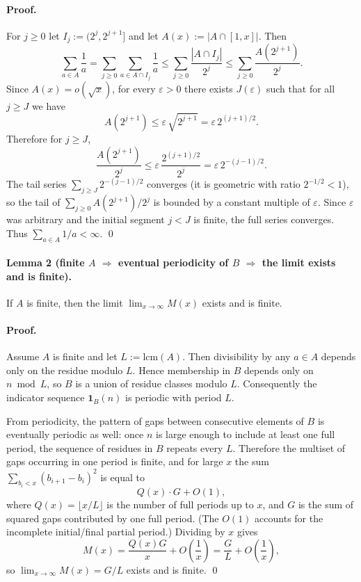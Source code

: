 \paragraph{Proof.}
For $j\ge 0$ let $I_j:=(2^j,2^{j+1}]$ and let $A(x):=|A\cap[1,x]|$.
Then
\[
\sum_{a\in A}\frac{1}{a}
= \sum_{j\ge 0}\sum_{a\in A\cap I_j}\frac{1}{a}
\le \sum_{j\ge 0}\frac{|A\cap I_j|}{2^j}
\le \sum_{j\ge 0}\frac{A(2^{j+1})}{2^j}.
\]
Since $A(x)=o(\sqrt x)$, for every $\varepsilon>0$ there exists $J(\varepsilon)$ such that for all $j\ge J$ we have
\[A(2^{j+1}) \le \varepsilon\,\sqrt{2^{j+1}}=\varepsilon\,2^{(j+1)/2}.
\]
Therefore for $j\ge J$,
\[\frac{A(2^{j+1})}{2^j} \le \varepsilon\,\frac{2^{(j+1)/2}}{2^j}=\varepsilon\,2^{-(j-1)/2}.
\]
The tail series $\sum_{j\ge J} 2^{-(j-1)/2}$ converges (it is geometric with ratio $2^{-1/2}<1$), so the tail of $\sum_{j\ge 0} A(2^{j+1})/2^j$ is bounded by a constant multiple of $\varepsilon$.
Since $\varepsilon$ was arbitrary and the initial segment $j<J$ is finite, the full series converges.
Thus $\sum_{a\in A} 1/a<\infty$.
\qed

\paragraph{Lemma 2 (finite $A$ $\Rightarrow$ eventual periodicity of $B$ $\Rightarrow$ the limit exists and is finite).}
If $A$ is finite, then the limit $\lim_{x\to\infty}M(x)$ exists and is finite.

\paragraph{Proof.}
Assume $A$ is finite and let $L:=\mathrm{lcm}(A)$. Then divisibility by any $a\in A$ depends only on the residue modulo $L$.
Hence membership in $B$ depends only on $n\bmod L$, so $B$ is a union of residue classes modulo $L$.
Consequently the indicator sequence $\mathbf{1}_B(n)$ is periodic with period $L$.

From periodicity, the pattern of gaps between consecutive elements of $B$ is eventually periodic as well: once $n$ is large enough to include at least one full period, the sequence of residues in $B$ repeats every $L$.
Therefore the multiset of gaps occurring in one period is finite, and for large $x$ the sum $\sum_{b_i<x}(b_{i+1}-b_i)^2$ is equal to
\[Q(x)\cdot G + O(1),
\]
where $Q(x)=\lfloor x/L\rfloor$ is the number of full periods up to $x$, and $G$ is the sum of squared gaps contributed by one full period.
(The $O(1)$ accounts for the incomplete initial/final partial period.)
Dividing by $x$ gives
\[M(x)=\frac{Q(x)G}{x}+O\left(\frac{1}{x}\right)=\frac{G}{L}+O\left(\frac{1}{x}\right),
\]
so $\lim_{x\to\infty}M(x)=G/L$ exists and is finite.
\qed

